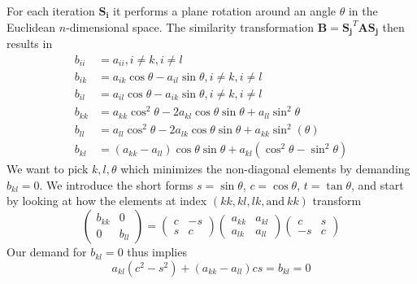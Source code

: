 \documentclass[a4paper]{revtex4}
\begin{document}
For each iteration $\mathbf{S_i}$ it performs a plane rotation around an angle
$\theta$ in the Euclidean $n$-dimensional space. The similarity transformation
$\mathbf{B} = \mathbf{S_j}^T \mathbf{A} \mathbf{S_j}$ then results in
\begin{align}
  b_{ii} &= a_{ii}, i \neq k, i \neq l \\
  b_{ik} &= a_{ik} \cos \theta - a_{il} \sin \theta, i \neq k, i \neq l
  \label{eq:offdiag1}\\
  b_{il} &= a_{il} \cos \theta - a_{ik} \sin \theta, i \neq k, i \neq l
  \label{eq:offdiag2}\\
  b_{kk} &= a_{kk} \cos^2 \theta - 2 a_{kl} \cos \theta \sin \theta +
    a_{ll} \sin^2 \theta \\
  b_{ll} &= a_{ll} \cos^2 \theta - 2 a_{lk} \cos \theta \sin \theta +
    a_{kk} \sin^2(\theta) \\
  b_{kl} &= (a_{kk} - a_{ll})\cos \theta \sin \theta + a_{kl}(\cos^2 \theta
    - \sin^2 \theta)
\end{align}
We want to pick $k, l, \theta$ which minimizes the non-diagonal elements by
demanding $b_{kl} = 0$. We introduce the short forms $s = \sin \theta$, $c =
\cos\theta$, $t = \tan\theta$, and start by looking at how the elements at
index $(kk, kl, lk, \text{and}~kk)$ transform
\begin{equation}
  \begin{pmatrix} b_{kk} & 0 \\ 0 & b_{ll} \end{pmatrix}
  =
  \begin{pmatrix} c & -s \\ s & c \end{pmatrix}
  \begin{pmatrix} a_{kk} & a_{kl} \\ a_{lk} & a_{ll} \end{pmatrix}
  \begin{pmatrix} c & s \\ -s & c \end{pmatrix}
\end{equation}
Our demand for $b_{kl} = 0$ thus implies
\begin{equation}
  \label{eq:rot-s}
  a_{kl}(c^2 - s^2) + (a_{kk} - a_{ll})cs = b_{kl} = 0
\end{equation}
\end{document}
